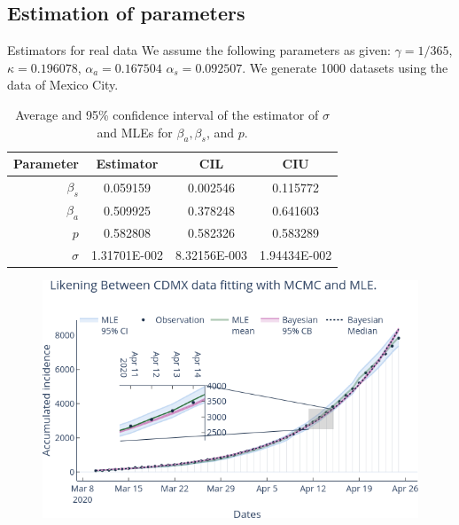 \subsection{Estimation of parameters}
\begin{frame}{Estimators for real data}
    We assume the following parameters as given:
    $\gamma =1 /365$,
    $\kappa = 0.196078$,
    $\alpha_a = 0.167504$ 
    $\alpha_s = 0.092507$. 
    We generate 1000 datasets using the data of Mexico City. 
    \begin{table}[tbh]
        \centering
        \begin{tabular}{%
            rccc
        }
            \hline
            Parameter  & Estimator & CIL & CIU
            \\
              \hline
            
            $\beta_s$ 
            
            &  0.059159 & 0.002546&
            0.115772
            \\
            $\beta_a$ 
        
            & 0.509925 & 0.378248 &
            0.641603
            \\
        
            $p$ 
            
            &0.582808 &0.582326&0.583289
            \\          
            $\sigma$ & 1.31701E-002
            & 8.32156E-003&
            1.94434E-002\\
                  \hline
        \end{tabular}
        \caption{
            Average and  95\% confidence interval of the estimator of 
            $\sigma$ and MLEs for $\beta_a,\beta_s$, and $p$.
        }
        \label{table:MLEREAL}
    \end{table}
\end{frame}
\begin{frame}
    \begin{figure}[htb]
        \centering
        \includegraphics[width=1.0\textwidth, keepaspectratio]{assets/Likening.png}
     
        \label{fig:real_data_fitting}
    \end{figure}    
\end{frame}

